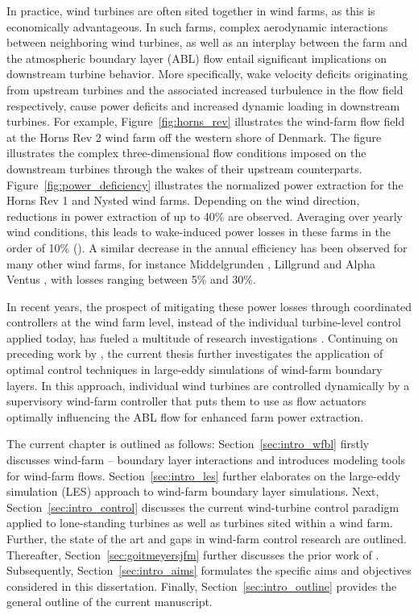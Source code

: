 In practice, wind turbines are often sited together in wind farms, as this is economically advantageous. In such farms, complex aerodynamic interactions between neighboring wind turbines, as well as an interplay between the farm and the atmospheric boundary layer (ABL) flow entail significant implications on downstream turbine behavior. More specifically, wake velocity deficits originating from upstream turbines and the associated increased turbulence in the flow field respectively, cause power deficits and increased dynamic loading in downstream turbines. For example, Figure~\ref{fig:horns_rev} illustrates the wind-farm flow field at the Horns Rev 2 wind farm off the western shore of Denmark. The figure illustrates the complex three-dimensional flow conditions imposed on the downstream turbines through the wakes of their upstream counterparts. Figure~\ref{fig:power_deficiency} illustrates the normalized power extraction for the Horns Rev 1 and Nysted wind farms. Depending on the wind direction, reductions in power extraction of up to 40\% are observed. Averaging over yearly wind conditions, this leads to wake-induced power losses in these farms in the order of 10\% (\citealt{jensen2005wake, barthelmie2010evaluation,barthelmie2010quantifying}). A similar decrease in the annual efficiency has been observed for many other wind farms, for instance Middelgrunden \citep{barthelmie2007modeling2}, Lillgrund \citep{dahlberg2009assessment} and Alpha Ventus \citep{westerhelweg2014wake},  with losses ranging between 5\% and 30\%.

In recent years, the prospect of mitigating these power losses through coordinated controllers at the wind farm level, instead of the individual turbine-level control applied today, has fueled a multitude of research investigations \citep{knudsen2015survey,boersma2017tutorial}. Continuing on preceding work by \cite{goit2015optimal}, the current thesis further investigates the application of optimal control techniques in large-eddy simulations of wind-farm boundary layers. In this approach, individual wind turbines are controlled dynamically by a supervisory wind-farm controller that puts them to use as flow actuators optimally influencing the ABL flow for enhanced farm power extraction. 

The current chapter is outlined as follows: Section~\ref{sec:intro_wfbl} firstly discusses wind-farm -- boundary layer interactions and introduces modeling tools for wind-farm flows. Section~\ref{sec:intro_les} further elaborates on the large-eddy simulation (LES) approach to wind-farm boundary layer simulations. Next, Section~\ref{sec:intro_control} discusses the current wind-turbine control paradigm applied to lone-standing turbines as well as turbines sited within a wind farm. Further, the state of the art and gaps in wind-farm control research are outlined. Thereafter, Section~\ref{sec:goitmeyersjfm} further discusses the prior work of \cite{goit2015optimal}. Subsequently, Section~\ref{sec:intro_aims} formulates the specific aims and objectives considered in this dissertation. Finally, Section~\ref{sec:intro_outline} provides the general outline of the current manuscript.

